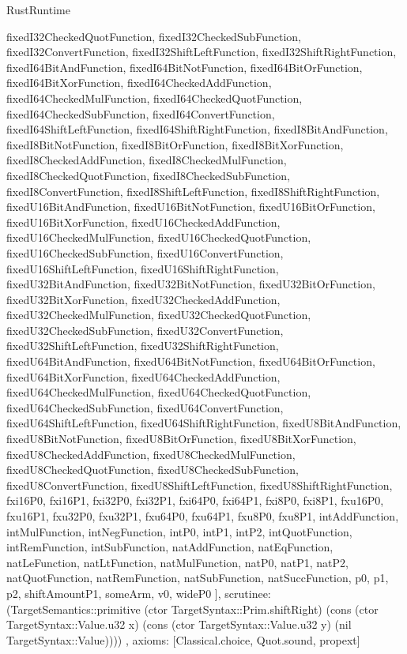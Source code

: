 \begin{lexlean}{RustRuntime}
\begin{semanticmodule}
{{      fixedI32CheckedQuotFunction,
      fixedI32CheckedSubFunction,
      fixedI32ConvertFunction,
      fixedI32ShiftLeftFunction,
      fixedI32ShiftRightFunction,
      fixedI64BitAndFunction,
      fixedI64BitNotFunction,
      fixedI64BitOrFunction,
      fixedI64BitXorFunction,
      fixedI64CheckedAddFunction,
      fixedI64CheckedMulFunction,
      fixedI64CheckedQuotFunction,
      fixedI64CheckedSubFunction,
      fixedI64ConvertFunction,
      fixedI64ShiftLeftFunction,
      fixedI64ShiftRightFunction,
      fixedI8BitAndFunction,
      fixedI8BitNotFunction,
      fixedI8BitOrFunction,
      fixedI8BitXorFunction,
      fixedI8CheckedAddFunction,
      fixedI8CheckedMulFunction,
      fixedI8CheckedQuotFunction,
      fixedI8CheckedSubFunction,
      fixedI8ConvertFunction,
      fixedI8ShiftLeftFunction,
      fixedI8ShiftRightFunction,
      fixedU16BitAndFunction,
      fixedU16BitNotFunction,
      fixedU16BitOrFunction,
      fixedU16BitXorFunction,
      fixedU16CheckedAddFunction,
      fixedU16CheckedMulFunction,
      fixedU16CheckedQuotFunction,
      fixedU16CheckedSubFunction,
      fixedU16ConvertFunction,
      fixedU16ShiftLeftFunction,
      fixedU16ShiftRightFunction,
      fixedU32BitAndFunction,
      fixedU32BitNotFunction,
      fixedU32BitOrFunction,
      fixedU32BitXorFunction,
      fixedU32CheckedAddFunction,
      fixedU32CheckedMulFunction,
      fixedU32CheckedQuotFunction,
      fixedU32CheckedSubFunction,
      fixedU32ConvertFunction,
      fixedU32ShiftLeftFunction,
      fixedU32ShiftRightFunction,
      fixedU64BitAndFunction,
      fixedU64BitNotFunction,
      fixedU64BitOrFunction,
      fixedU64BitXorFunction,
      fixedU64CheckedAddFunction,
      fixedU64CheckedMulFunction,
      fixedU64CheckedQuotFunction,
      fixedU64CheckedSubFunction,
      fixedU64ConvertFunction,
      fixedU64ShiftLeftFunction,
      fixedU64ShiftRightFunction,
      fixedU8BitAndFunction,
      fixedU8BitNotFunction,
      fixedU8BitOrFunction,
      fixedU8BitXorFunction,
      fixedU8CheckedAddFunction,
      fixedU8CheckedMulFunction,
      fixedU8CheckedQuotFunction,
      fixedU8CheckedSubFunction,
      fixedU8ConvertFunction,
      fixedU8ShiftLeftFunction,
      fixedU8ShiftRightFunction,
      fxi16P0,
      fxi16P1,
      fxi32P0,
      fxi32P1,
      fxi64P0,
      fxi64P1,
      fxi8P0,
      fxi8P1,
      fxu16P0,
      fxu16P1,
      fxu32P0,
      fxu32P1,
      fxu64P0,
      fxu64P1,
      fxu8P0,
      fxu8P1,
      intAddFunction,
      intMulFunction,
      intNegFunction,
      intP0,
      intP1,
      intP2,
      intQuotFunction,
      intRemFunction,
      intSubFunction,
      natAddFunction,
      natEqFunction,
      natLeFunction,
      natLtFunction,
      natMulFunction,
      natP0,
      natP1,
      natP2,
      natQuotFunction,
      natRemFunction,
      natSubFunction,
      natSuccFunction,
      p0,
      p1,
      p2,
      shiftAmountP1,
      someArm,
      v0,
      wideP0
    ],
    scrutinee: (TargetSemantics::primitive (ctor TargetSyntax::Prim.shiftRight) (cons (ctor TargetSyntax::Value.u32 x) (cons (ctor TargetSyntax::Value.u32 y) (nil TargetSyntax::Value))))
  },
  axioms: [Classical.choice, Quot.sound, propext]
}


\end{semanticmodule}
\end{lexlean}

